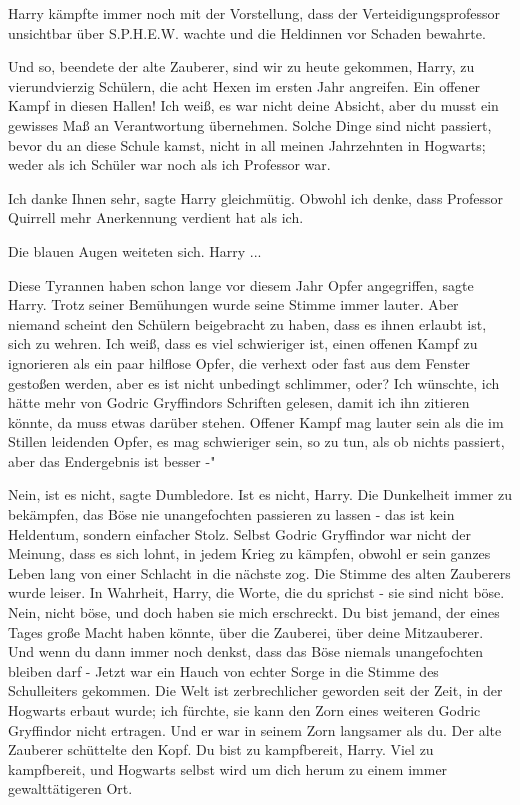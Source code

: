 Harry kämpfte immer noch mit der Vorstellung, dass der Verteidigungsprofessor
unsichtbar über S.P.H.E.W. wachte und die Heldinnen vor Schaden bewahrte.

\glqq Und so\grqq{}, beendete der alte Zauberer, \glqq sind wir zu heute
gekommen, Harry, zu vierundvierzig Schülern, die acht Hexen im ersten Jahr
angreifen. Ein offener Kampf in diesen Hallen! Ich weiß, es war nicht deine
Absicht, aber du musst ein gewisses Maß an Verantwortung übernehmen. Solche
Dinge sind nicht passiert, bevor du an diese Schule kamst, nicht in all meinen
Jahrzehnten in Hogwarts; weder als ich Schüler war noch als ich Professor
war.\grqq{}

\glqq Ich danke Ihnen sehr\grqq{}, sagte Harry gleichmütig. \glqq Obwohl ich
denke, dass Professor Quirrell mehr Anerkennung verdient hat als ich.\grqq{}

Die blauen Augen weiteten sich. \glqq Harry ...\grqq{}

\glqq Diese Tyrannen haben schon lange vor diesem Jahr Opfer angegriffen\grqq{},
sagte Harry. Trotz seiner Bemühungen wurde seine Stimme immer lauter. \glqq Aber
niemand scheint den Schülern beigebracht zu haben, dass es ihnen erlaubt ist,
sich zu wehren. Ich weiß, dass es viel schwieriger ist, einen offenen Kampf zu
ignorieren als ein paar hilflose Opfer, die verhext oder fast aus dem Fenster
gestoßen werden, aber es ist nicht unbedingt schlimmer, oder? Ich wünschte, ich
hätte mehr von Godric Gryffindors Schriften gelesen, damit ich ihn zitieren
könnte, da muss etwas darüber stehen. Offener Kampf mag lauter sein als die im
Stillen leidenden Opfer, es mag schwieriger sein, so zu tun, als ob nichts
passiert, aber das Endergebnis ist besser -"

\glqq Nein, ist es nicht\grqq{}, sagte Dumbledore. \glqq Ist es nicht, Harry.
Die Dunkelheit immer zu bekämpfen, das Böse nie unangefochten passieren zu
lassen - das ist kein Heldentum, sondern einfacher Stolz. Selbst Godric
Gryffindor war nicht der Meinung, dass es sich lohnt, in jedem Krieg zu kämpfen,
obwohl er sein ganzes Leben lang von einer Schlacht in die nächste zog.\grqq{}
Die Stimme des alten Zauberers wurde leiser. \glqq In Wahrheit, Harry, die
Worte, die du sprichst - sie sind nicht böse. Nein, nicht böse, und doch haben
sie mich erschreckt. Du bist jemand, der eines Tages große Macht haben könnte,
über die Zauberei, über deine Mitzauberer. Und wenn du dann immer noch denkst,
dass das Böse niemals unangefochten bleiben darf -\grqq{} Jetzt war ein Hauch
von echter Sorge in die Stimme des Schulleiters gekommen. \glqq Die Welt ist
zerbrechlicher geworden seit der Zeit, in der Hogwarts erbaut wurde; ich
fürchte, sie kann den Zorn eines weiteren Godric Gryffindor nicht ertragen. Und
er war in seinem Zorn langsamer als du.\grqq{} Der alte Zauberer schüttelte den
Kopf. \glqq Du bist zu kampfbereit, Harry. Viel zu kampfbereit, und Hogwarts
selbst wird um dich herum zu einem immer gewalttätigeren Ort.\grqq{}

